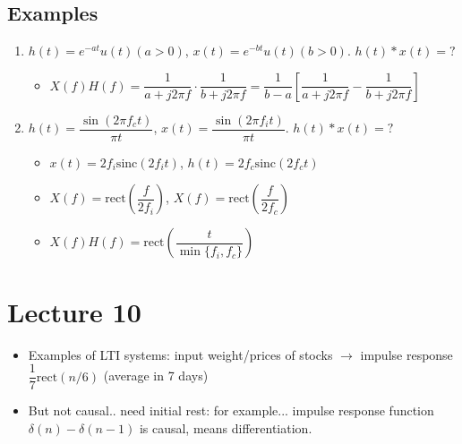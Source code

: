 \documentclass{article}
\begin{document}
\subsection{Examples}
\begin{enumerate}
    \item $h(t)=e^{-at}u(t)(a>0)$, $x(t)=e^{-bt}u(t)(b>0)$. $h(t)*x(t)=?$
    \begin{itemize} 
    \item $X(f)H(f)=\dfrac{1}{a+j2\pi f}\cdot\dfrac{1}{b+j2\pi f}=\dfrac{1}{b-a}\left[\dfrac{1}{a+j2\pi f}-\dfrac{1}{b+j2\pi f}\right]$
    \end{itemize}
    \item $h(t)=\dfrac{\sin{(2\pi f_ct)}}{\pi t}$, $x(t)=\dfrac{\sin{(2\pi f_it)}}{\pi t}$. $h(t)*x(t)=?$
    \begin{itemize}
        \item $x(t)=2f_i\mathrm{sinc}(2f_it)$, $h(t)=2f_c\mathrm{sinc}(2f_ct)$
        \item $X(f)=\mathrm{rect}\left(\dfrac{f}{2f_i}\right)$, $X(f)=\mathrm{rect}\left(\dfrac{f}{2f_c}\right)$
        \item $X(f)H(f)=\mathrm{rect}\left(\dfrac{t}{\min\{f_i,f_c\}}\right)$
    \end{itemize}
\end{enumerate}
\section{Lecture 10}
\begin{itemize}
    \item Examples of LTI systems: input weight/prices of stocks $\rightarrow$ impulse response $\dfrac{1}{7}\mathrm{rect}(n/6)$ (average in 7 days)
    \item But not causal.. need initial rest: for example... impulse response function $\delta(n)-\delta(n-1)$ is causal, means differentiation.
\end{itemize}
\end{document}
